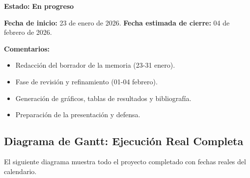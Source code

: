 \documentclass[12pt,a4paper]{article}
\begin{document}
\textbf{Estado:} \textcolor{inprogress}{\textbf{En progreso}}

\textbf{Fecha de inicio:} 23 de enero de 2026.
\textbf{Fecha estimada de cierre:} 04 de febrero de 2026.

\textbf{Comentarios:}
\begin{itemize}
    \item Redacción del borrador de la memoria (23-31 enero).
    \item Fase de revisión y refinamiento (01-04 febrero).
    \item Generación de gráficos, tablas de resultados y bibliografía.
    \item Preparación de la presentación y defensa.
\end{itemize}

\subsection{Diagrama de Gantt: Ejecución Real Completa}

El siguiente diagrama muestra todo el proyecto completado con fechas reales del calendario.
\end{document}
